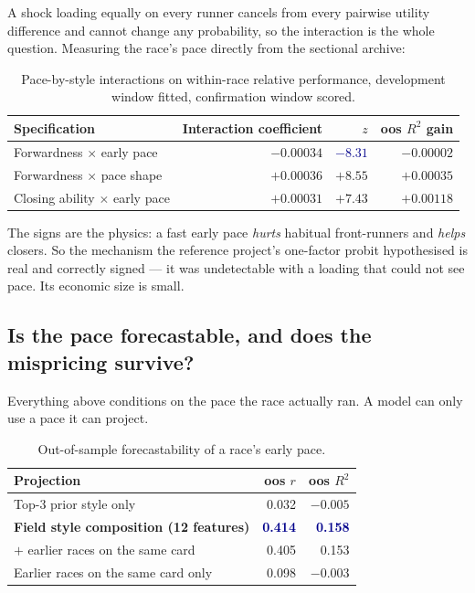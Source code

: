 \documentclass[11pt,a4paper]{article}
\newcommand{\good}[1]{\textcolor{darkblue}{\textbf{#1}}}
\begin{document}
A shock loading equally on every runner cancels from every pairwise utility
difference and cannot change any probability, so the interaction is the whole
question. Measuring the race's pace directly from the sectional archive:

\begin{table}[htbp]\centering\small
\caption{Pace-by-style interactions on within-race relative performance,
development window fitted, confirmation window scored.}
\begin{tabular}{lrrr}
\toprule
Specification & Interaction coefficient & $z$ & oos $R^2$ gain\\
\midrule
Forwardness $\times$ early pace & $-0.00034$ & \good{$-8.31$} & $-0.00002$\\
Forwardness $\times$ pace shape & $+0.00036$ & $+8.55$ & $+0.00035$\\
Closing ability $\times$ early pace & $+0.00031$ & $+7.43$ & $+0.00118$\\
\bottomrule
\end{tabular}
\end{table}

The signs are the physics: a fast early pace \emph{hurts} habitual front-runners
and \emph{helps} closers. So the mechanism the reference project's one-factor
probit hypothesised is real and correctly signed --- it was undetectable with a
loading that could not see pace. Its economic size is small.

\subsection{Is the pace forecastable, and does the mispricing survive?}

Everything above conditions on the pace the race actually ran. A model can only
use a pace it can project.

\begin{table}[htbp]\centering\small
\caption{Out-of-sample forecastability of a race's early pace.}
\begin{tabular}{lrr}
\toprule
Projection & oos $r$ & oos $R^2$\\
\midrule
Top-3 prior style only & 0.032 & $-0.005$\\
\textbf{Field style composition (12 features)} & \good{0.414} & \good{0.158}\\
$+$ earlier races on the same card & 0.405 & 0.153\\
Earlier races on the same card only & 0.098 & $-0.003$\\
\bottomrule
\end{tabular}
\end{table}
\end{document}
